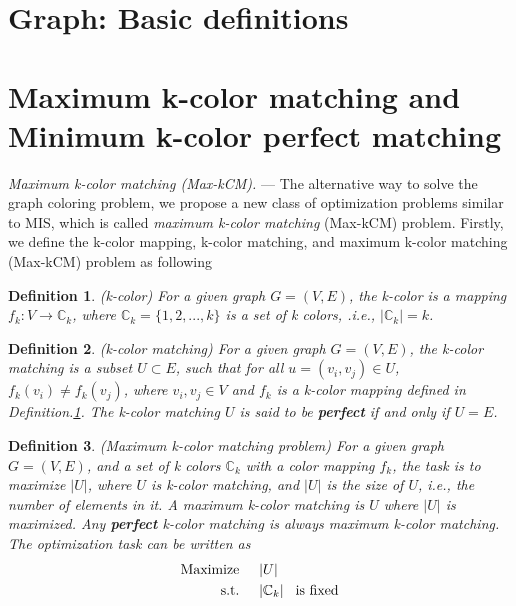 \documentclass[%
 reprint,
nofootinbib,
 amsmath,amssymb,
 aps,
floatfix,
]{revtex4-2}
\newtheorem{definition}{Definition}
\begin{document}



\clearpage


\onecolumngrid
\appendix

\section{Graph: Basic definitions }

\section{Maximum k-color matching and Minimum k-color perfect matching} \label{Max-Min-kcm}

\emph{Maximum k-color matching {\rm (Max-kCM)}.} ---  The alternative way to solve the graph coloring problem, we propose a new class of optimization problems similar to MIS, which is called \emph{maximum k-color matching} (Max-kCM) problem. Firstly, we define the k-color mapping, k-color matching, and maximum k-color matching (Max-kCM) problem as following 
\begin{definition}
\label{def:k-color}
{\rm (k-color)} For a given graph $G = (V,E)$, the k-color is a mapping $f_k: V \to \mathbb{C}_k$, where $\mathbb{C}_k = \{1,2,...,k\}$ is a set of k colors, .i.e., $|\mathbb{C}_k| = k$.
\end{definition}
\begin{definition}
\label{def:k-color-matching}
{\rm (k-color matching)}
For a given graph $G=(V,E)$, the k-color matching is a subset $U \subset E$, such that for all $u=(v_i,v_j) \in {U}$, $f_k(v_i) \neq f_k(v_j)$, where $v_i,v_j \in V$ and $f_k$ is a k-color mapping defined in {\rm Definition.\ref{def:k-color}}. The k-color matching $U$ is said to be {\rm\textbf{perfect}} if and only if $U=E$.
\end{definition}
\begin{definition}
\label{def:maximum-k-color-matching-problem}
{\rm (Maximum k-color matching problem)} For a given graph $G=(V,E)$, and a set of k colors $\mathbb{C}_k$ with a color mapping $f_k$, the task is to maximize $|U|$, where $U$ is k-color matching, and $|U|$ is the size of $U$, i.e., the number of elements in it. A maximum k-color matching is $U$ where $|U|$ is maximized. Any {\rm \textbf{perfect}} k-color matching is always maximum k-color matching. The optimization task can be written as
\begin{align}\label{eq-max-kcm}
\text{\rm Maximize} \hspace{5mm} &|U|  \nonumber \\
\text{\rm s.t.} \hspace{5mm} &|\mathbb{C}_k| \hspace{3mm} \text{\rm is fixed}   
\end{align}
\end{definition}
\end{document}
